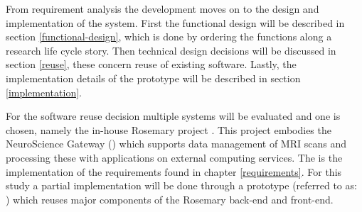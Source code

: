 

From requirement analysis the development moves on to the design and implementation of the system.
First the functional design will be described in section \ref{functional-design}, which is done by ordering the functions along a research life cycle story.
Then technical design decisions will be discussed in section \ref{reuse}, these concern reuse of existing software.
Lastly, the implementation details of the \ivfsystem{} prototype will be described in section \ref{implementation}.

For the software reuse decision multiple systems will be evaluated and one is chosen, namely the in-house Rosemary project \cite{rosemary}.
This project embodies the NeuroScience Gateway (\nsg{}) \cite{shahand2015data} which supports data management of MRI scans and processing these with applications on external computing services.
The \ivfsystem{} is the implementation of the requirements found in chapter \ref{requirements}.
For this study a partial implementation will be done through a prototype (referred to as: \ivfprototype{}) which reuses major components of the Rosemary back-end and front-end.